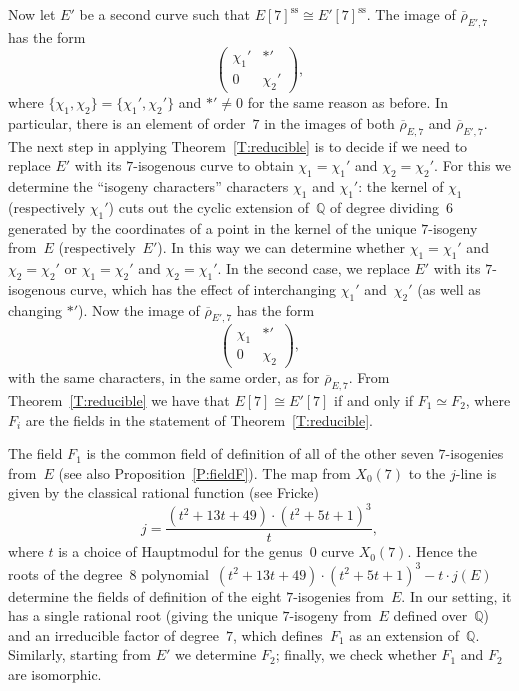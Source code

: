 \documentclass[12pt, reqno]{amsart}
\newcommand{\F}{\mathbb{F}}
\newcommand{\Q}{\mathbb{Q}}
\newcommand{\rhobar}{{\overline{\rho}}}
\DeclareMathOperator{\sss}{ss}
\numberwithin{equation}{section}
\theoremstyle{definition}
\theoremstyle{remark}
\begin{document}
Now let $E'$ be a second curve such that $E[7]^{\sss}\cong
E'[7]^{\sss}$. 
The image of $\rhobar_{E',7}$ has the form
\[
  \begin{pmatrix}\chi_1'&*'\\0&\chi_2'  \end{pmatrix},
  \]
where $\{\chi_1,\chi_2\}=\{\chi_1',\chi_2'\}$ and $*' \neq 0$ for the
same reason as before.  In particular, there is an element of
order~$7$ in the images of both $\rhobar_{E,7}$ and $\rhobar_{E',7}$.
The next step in applying Theorem~\ref{T:reducible} is to decide if we
need to replace $E'$ with its $7$-isogenous curve to obtain
$\chi_1=\chi_1'$ and $\chi_2=\chi_2'$. For this we determine the
``isogeny characters'' characters $\chi_1$ and $\chi_1'$: the kernel
of $\chi_1$ (respectively $\chi_1'$) cuts out the cyclic extension
of~$\Q$ of degree dividing~$6$ generated by the coordinates of a point
in the kernel of the unique $7$-isogeny from~$E$ (respectively~$E'$).
In this way we can determine whether $\chi_1=\chi_1'$ and
$\chi_2=\chi_2'$ or $\chi_1=\chi_2'$ and $\chi_2=\chi_1'$.  In the
second case, we replace $E'$ with its $7$-isogenous curve, which has
the effect of interchanging $\chi_1'$ and~$\chi_2'$ (as well as
changing $*'$).  Now the image of $\rhobar_{E',7}$ has the form
\[
\begin{pmatrix}\chi_1&*'\\0&\chi_2  \end{pmatrix},
\]
with the same characters, in the same order, as for
$\rhobar_{E,7}$. From Theorem~\ref{T:reducible} we have that
$E[7]\cong E'[7]$ if and only if $F_1 \simeq F_2$, where $F_i$ are the
fields in the statement of Theorem~\ref{T:reducible}.


The field $F_1$ is the common field of definition of all of the other
seven $7$-isogenies from~$E$ (see also Proposition~\ref{P:fieldF}).
The map from $X_0(7)$ to the $j$-line is given by the classical
rational function (see Fricke)
\[
   j = \frac{(t^{2} + 13t + 49) \cdot (t^{2} + 5t + 1)^{3}}{t},
\]
where $t$ is a choice of Hauptmodul for the genus~$0$ curve
$X_0(7)$. Hence the roots of the degree~$8$ polynomial~$(t^{2} + 13t +
49) \cdot (t^{2} + 5t + 1)^{3} -t\cdot j(E)$ determine the fields of
definition of the eight $7$-isogenies from~$E$. In our setting, it has
a single rational root (giving the unique $7$-isogeny from~$E$ defined
over~$\Q$) and an irreducible factor of degree~$7$, which
defines~$F_1$ as an extension of~$\Q$. Similarly, starting from $E'$
we determine $F_2$; finally, we check whether $F_1$ and $F_2$ are
isomorphic.
\end{document}
